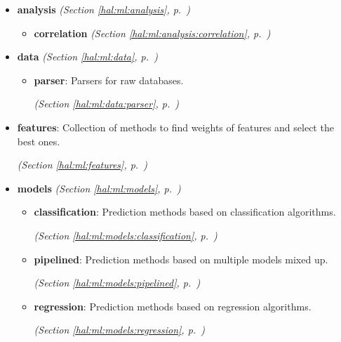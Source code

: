 \begin{itemize}
\setlength{\parskip}{0ex}
\item \textbf{analysis}
  \textit{(Section \ref{hal:ml:analysis}, p.~\pageref{hal:ml:analysis})}

  \begin{itemize}
\setlength{\parskip}{0ex}
    \item \textbf{correlation}
  \textit{(Section \ref{hal:ml:analysis:correlation}, p.~\pageref{hal:ml:analysis:correlation})}

  \end{itemize}
\item \textbf{data}
  \textit{(Section \ref{hal:ml:data}, p.~\pageref{hal:ml:data})}

  \begin{itemize}
\setlength{\parskip}{0ex}
    \item \textbf{parser}: Parsers for raw databases. 


  \textit{(Section \ref{hal:ml:data:parser}, p.~\pageref{hal:ml:data:parser})}

  \end{itemize}
\item \textbf{features}: Collection of methods to find weights of features and select the best ones. 


  \textit{(Section \ref{hal:ml:features}, p.~\pageref{hal:ml:features})}

\item \textbf{models}
  \textit{(Section \ref{hal:ml:models}, p.~\pageref{hal:ml:models})}

  \begin{itemize}
\setlength{\parskip}{0ex}
    \item \textbf{classification}: Prediction methods based on classification algorithms. 


  \textit{(Section \ref{hal:ml:models:classification}, p.~\pageref{hal:ml:models:classification})}

    \item \textbf{pipelined}: Prediction methods based on multiple models mixed up. 


  \textit{(Section \ref{hal:ml:models:pipelined}, p.~\pageref{hal:ml:models:pipelined})}

    \item \textbf{regression}: Prediction methods based on regression algorithms. 


  \textit{(Section \ref{hal:ml:models:regression}, p.~\pageref{hal:ml:models:regression})}


\end{itemize}
\end{itemize}
